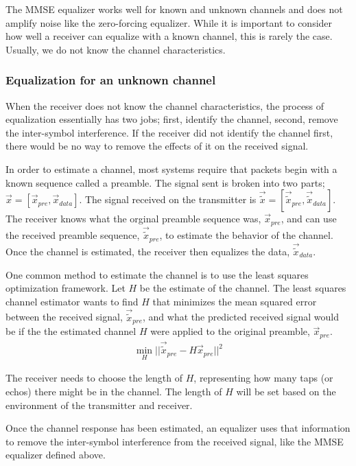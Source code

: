 The MMSE equalizer works well for known and unknown channels and does not amplify noise like the zero-forcing equalizer.
While it is important to consider how well a receiver can equalize with a known channel, this is rarely the case.  Usually, we do not know the channel characteristics.

\subsubsection{Equalization for an unknown channel}
When the receiver does not know the channel characteristics, the process of equalization essentially has two jobs; first, identify the channel, second, remove the inter-symbol interference. If the receiver did not identify the channel first, there would be no way to remove the effects of it on the received signal. 

In order to estimate a channel, most systems require that packets begin with a known sequence called a preamble. The signal sent is broken into two parts; $\vec{x} = [\vec{x}_{pre}, \vec{x}_{data}]$.  The signal received on the transmitter is $\vec{\tilde{x}}=[\vec{\tilde{x}}_{pre},\vec{\tilde{x}}_{data}]$.  
The receiver knows what the orginal preamble sequence was, $\vec{x}_{pre}$, and can use the received preamble sequence, $\vec{\tilde{x}}_{pre}$, to estimate the behavior of the channel.
Once the channel is estimated, the receiver then equalizes the data, $\vec{\tilde{x}}_{data}$.

One common method to estimate the channel is to use the least squares optimization framework. Let $H$ be the estimate of the channel.  The least squares channel estimator wants to find $H$ that minimizes the mean squared error between the received signal, $\vec{\tilde{x}}_{pre}$, and what the predicted received signal would be if the the estimated channel $H$ were applied to the original preamble, $\vec{x}_{pre}$.
\begin{align}
\min_H ||\vec{\tilde{x}}_{pre}-H\vec{x}_{pre}||^2
\end{align}

The receiver needs to choose the length of $H$, representing how many taps (or echos) there might be in the channel.  The length of $H$ will be set based on the environment of the transmitter and receiver.

Once the channel response has been estimated, an equalizer uses that information to remove the inter-symbol interference from the received signal, like the MMSE equalizer defined above.

